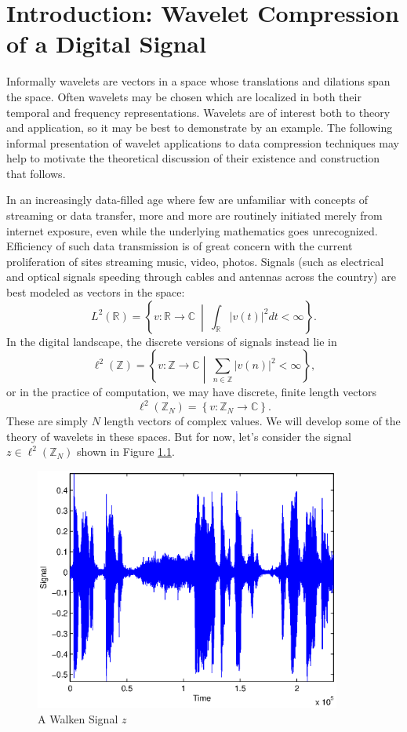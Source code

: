 \documentclass{report}
\newcommand{\Z}{\mathbb{Z}}
\newcommand{\R}{\mathbb{R}}
\newcommand{\C}{\mathbb{C}}
\begin{document}


\chapter{Introduction: Wavelet Compression of a Digital Signal}
\label{ch:intro}

Informally wavelets are vectors in a space whose translations and dilations span the space. Often wavelets may be chosen which are localized in both their temporal and frequency representations. Wavelets are of interest both to theory and application, so it may be best to demonstrate by an example. The following informal presentation of wavelet applications to data compression techniques may help to motivate the theoretical discussion of their existence and construction that follows.

In an increasingly data-filled age where few are unfamiliar with concepts of streaming or data transfer, more and more are routinely initiated merely from internet exposure, even while the underlying mathematics goes unrecognized. Efficiency of such data transmission is of great concern with the current proliferation of sites streaming music, video, photos.   Signals (such as electrical and optical signals speeding through cables and antennas across the country) are best modeled as vectors in the space:
$$
L^2 (\R )=\left \{ v: \R \to \C \  \middle | \ \int_\R |v(t)|^2 dt <\infty \right \}.
$$
In the digital landscape, the discrete versions of signals instead lie in 
$$
\ell^2 (\Z) = \left \{ v: \Z \to \C  \middle | \ \sum_{n\in \Z} |v(n)|^2 <\infty \right \},
$$
or in the practice of computation, we may have discrete, finite length vectors
$$
\ell^2 (\Z_N) = \left \{ v: \Z_N \to \C \right \}.
$$
These are simply $N$ length vectors of complex values. We will develop some of the theory of wavelets in these spaces. But for now, let's consider the signal $z \in \ell^2 (\Z_N)$ shown in Figure \ref{fig:wak}.

\begin{figure}
\center
\caption{A Walken Signal $z$}
\label{fig:wak}
\includegraphics[height=8cm]{figure1.eps}

\end{figure}
\end{document}
